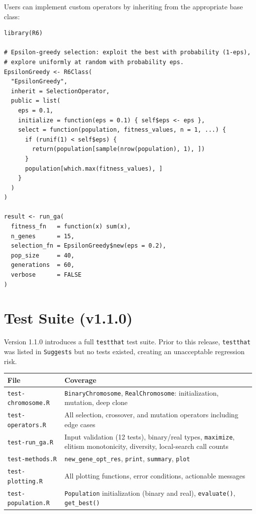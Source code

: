 \documentclass[11pt,a4paper]{article}
\begin{document}
Users can implement custom operators by inheriting from the appropriate base
class:

\begin{lstlisting}
library(R6)

# Epsilon-greedy selection: exploit the best with probability (1-eps),
# explore uniformly at random with probability eps.
EpsilonGreedy <- R6Class(
  "EpsilonGreedy",
  inherit = SelectionOperator,
  public = list(
    eps = 0.1,
    initialize = function(eps = 0.1) { self$eps <- eps },
    select = function(population, fitness_values, n = 1, ...) {
      if (runif(1) < self$eps) {
        return(population[sample(nrow(population), 1), ])
      }
      population[which.max(fitness_values), ]
    }
  )
)

result <- run_ga(
  fitness_fn   = function(x) sum(x),
  n_genes      = 15,
  selection_fn = EpsilonGreedy$new(eps = 0.2),
  pop_size     = 40,
  generations  = 60,
  verbose      = FALSE
)
\end{lstlisting}

\section{Test Suite (v1.1.0)}

Version 1.1.0 introduces a full \texttt{testthat} \citep{Wickham2011} test
suite. Prior to this release, \texttt{testthat} was listed in
\texttt{Suggests} but no tests existed, creating an unacceptable regression
risk.

\begin{center}
\begin{tabular}{lp{8cm}}
  \toprule
  \textbf{File} & \textbf{Coverage} \\
  \midrule
  \texttt{test-chromosome.R}  & \texttt{BinaryChromosome}, \texttt{RealChromosome}: initialization, mutation, deep clone \\
  \texttt{test-operators.R}   & All selection, crossover, and mutation operators including edge cases \\
  \texttt{test-run\_ga.R}     & Input validation (12 tests), binary/real types, \texttt{maximize}, elitism monotonicity, diversity, local-search call counts \\
  \texttt{test-methods.R}     & \texttt{new\_gene\_opt\_res}, \texttt{print}, \texttt{summary}, \texttt{plot} \\
  \texttt{test-plotting.R}    & All plotting functions, error conditions, actionable messages \\
  \texttt{test-population.R}  & \texttt{Population} initialization (binary and real), \texttt{evaluate()}, \texttt{get\_best()} \\
  \bottomrule
\end{tabular}
\end{center}
\end{document}
